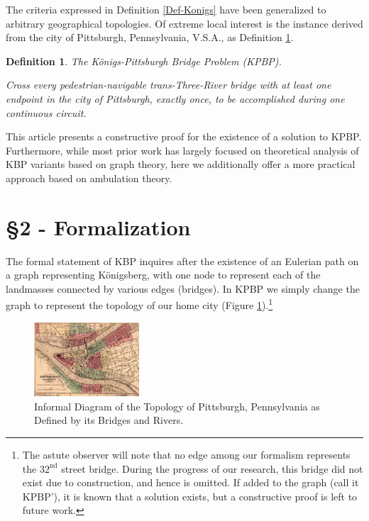 \documentclass[twocolumn]{article}
\theoremstyle{plain}  %
\newtheorem{defn}{Definition}
\theoremstyle{definition}  %
\theoremstyle{remark}  %
\begin{document}
The criteria expressed in Definition \ref{Def-Konigs} have been generalized to arbitrary geographical topologies. %
Of extreme local interest is the instance derived from the city of Pittsburgh, Pennsylvania, V.S.A., as Definition \ref{Def-KonigsPgh}.

\begin{defn} \label{Def-KonigsPgh}
	The K\"onigs-Pittsburgh Bridge Problem (KPBP).

Cross every pedestrian-navigable trans-Three-River bridge with at least one endpoint in the city of Pittsburgh, exactly once, to be accomplished during one continuous circuit.
\end{defn}

This article presents a constructive proof for the existence of a solution to KPBP. Furthermore, while most prior work \cite{wikipedia} has largely focused on theoretical analysis of KBP variants based on graph theory, here we additionally offer a more practical approach based on ambulation theory.

\section*{\S 2 - Formalization}

The formal statement of KBP inquires after the existence of an Eulerian path on a graph representing K\"onigsberg, with one node to represent each of the landmasses connected by various edges (bridges). In KPBP we simply change the graph to represent the topology of our home city (Figure \ref{fig:map}).\footnote{The astute observer will note that no edge among our formalism represents the $32^{\text{nd}}$ street bridge. During the progress of our research, this bridge did not exist due to construction, and hence is omitted. If added to the graph (call it KPBP'), it is known that a solution exists, but a constructive proof is left to future work.}

\begin{figure}[t]
\centering
	\includegraphics[width=0.35\textwidth]{1859pittsburgh.jpg}
	\caption{Informal Diagram of the Topology of Pittsburgh, Pennsylvania as Defined by its Bridges and Rivers.}
	\label{fig:map}
\end{figure}
\end{document}
